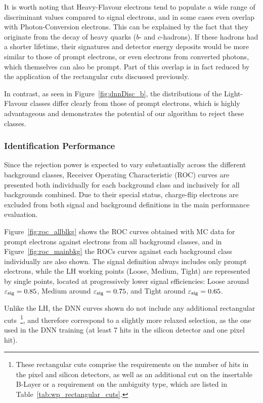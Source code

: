 It is worth noting that Heavy-Flavour electrons tend to populate a wide range of discriminant values compared to signal electrons, and in some cases even overlap with Photon-Conversion electrons. This can be explained by the fact that they originate from the decay of heavy quarks ($b$- and $c$-hadrons). If these hadrons had a shorter lifetime, their signatures and detector energy deposits would be more similar to those of prompt electrons, or even electrons from converted photons, which themselves can also be prompt. Part of this overlap is in fact reduced by the application of the rectangular cuts discussed previously.

In contrast, as seen in Figure~\ref{fig:dnnDisc_b}, the distributions of the Light-Flavour classes differ clearly from those of prompt electrons, which is highly advantageous and demonstrates the potential of our algorithm to reject these classes.

\subsubsection{Identification Performance}

Since the rejection power is expected to vary substantially across the different background classes, Receiver Operating Characteristic (ROC) curves are presented both individually for each background class and inclusively for all backgrounds combined. Due to their special status, charge-flip electrons are excluded from both signal and background definitions in the main performance evaluation.

Figure~\ref{fig:roc_allblkg} shows the ROC curves obtained with MC data for prompt electrons against electrons from all background classes, and in Figure~\ref{fig:roc_mainbkg} the ROCs curves against each background class individually are also shown. The signal definition always includes only prompt electrons, while the LH working points (Loose, Medium, Tight) are represented by single points, located at progressively lower signal efficiencies: Loose around $\varepsilon_{\rm sig} = 0.85$, Medium around $\varepsilon_{\rm sig} =0.75$, and Tight around $\varepsilon_{\rm sig} =0.65$.

Unlike the LH, the DNN curves shown do not include any additional rectangular cuts~\footnote{These rectangular cuts comprise the requirements on the number of hits in the pixel and silicon detectors, as well as an additional cut on the insertable B-Layer or a requirement on the ambiguity type, which are listed in Table~\ref{tab:wp_rectangular_cuts}.}, and therefore correspond to a slightly more relaxed selection, as the one used in the DNN training (at least 7 hits in the silicon detector and one pixel hit).

